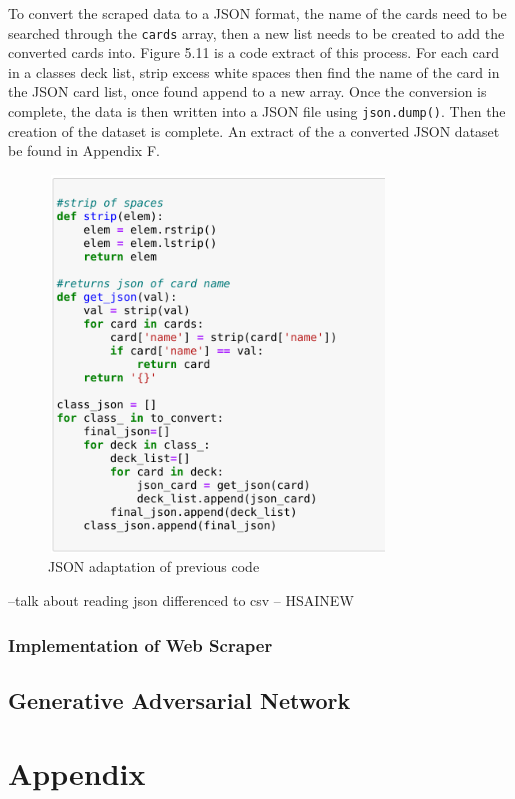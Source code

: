 \documentclass{report} %
\begin{document}
To convert the scraped data to a JSON format, the name of the cards need to be searched through the \texttt{cards} array, then a new list needs to be created to add the converted cards into. Figure 5.11 is a code extract of this process. For each card in a classes deck list, strip excess white spaces then find the name of the card in the JSON card list, once found append to a new array. Once the conversion is complete, the data is then written into a JSON file using \texttt{json.dump()}. Then the creation of the dataset is complete. An extract of the a converted JSON dataset be found in Appendix F.

\begin{figure}[H]
\centering
\includegraphics[width=9cm, height=10cm]{JSONConversion}
\caption{JSON adaptation of previous code\protect}
 \label{board}
\end{figure}

--talk about reading json differenced to csv -- HSAINEW

\subsection{Implementation of Web Scraper}
\section{Generative Adversarial Network}


\chapter{Appendix}
\end{document}
